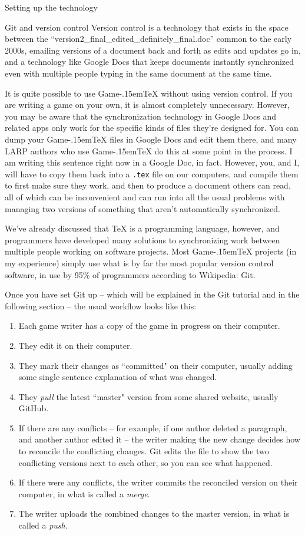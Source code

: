 \documentclass[11pt,  total={6in, 8in}]{article}
\def\gametex{\mbox{Game\kern-.15em\TeX}}
\begin{document}
\begin{section}{Setting up the technology}
\begin{subsection}{Git and version control}
Version control is a technology that exists in the space between the ``version2\_final\_edited\_definitely\_final.doc'' common to the early 2000s, emailing versions of a document back and forth as edits and updates go in, and a technology like Google Docs that keeps documents instantly synchronized even with multiple people typing in the same document at the same time.

It is quite possible to use \gametex{} without using version control.  If you are writing a game on your own, it is almost completely unnecessary.  However, you may be aware that the synchronization technology in Google Docs and related apps only work for the specific kinds of files they're designed for.  You can dump your \gametex{} files in Google Docs and edit them there, and many LARP authors who use \gametex{} do this at some point in the process.  I am writing this sentence right now in a Google Doc, in fact.  However, you, and I, will have to copy them back into a \texttt{.tex} file on our computers, and compile them to first make sure they work, and then to produce a document others can read, all of which can be inconvenient and can run into all the usual problems with managing two versions of something that aren't automatically synchronized.

We've already discussed that \TeX{} is a programming language, however, and programmers have developed many solutions to synchronizing work between multiple people working on software projects.  Most \gametex{} projects (in my experience) simply use what is by far the most popular version control software, in use by 95\% of programmers according to Wikipedia: Git.

Once you have set Git up -- which will be explained in the Git tutorial and in the following section -- the usual workflow looks like this:
\begin{enumerate}
\item Each game writer has a copy of the game in progress on their computer.
\item They edit it on their computer.
\item They mark their changes as ``committed" on their computer, usually adding some single sentence explanation of what was changed.
\item They \textit{pull} the latest ``master" version from some shared website, usually GitHub.  
\item If there are any conflicts – for example, if one author deleted a paragraph, and another author edited it – the writer making the new change decides how to reconcile the conflicting changes.  Git edits the file to show the two conflicting versions next to each other, so you can see what happened.
\item If there were any conflicts, the writer commits the reconciled version on their computer, in what is called a \textit{merge}.
\item The writer uploads the combined changes to the master version, in what is called a \textit{push}.
\end{enumerate}


\end{subsection}
\end{section}
\end{document}
